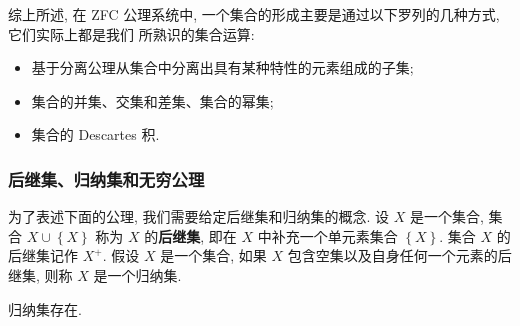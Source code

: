 \documentclass[10pt,UTF8]{book} %
\begin{document}
综上所述, 在 ZFC 公理系统中, 一个集合的形成主要是通过以下罗列的几种方式, 它们实际上都是我们
所熟识的集合运算:
\begin{itemize}[itemsep=0pt]
    \item 基于分离公理从集合中分离出具有某种特性的元素组成的子集;
    \item 集合的并集、交集和差集、集合的幂集;
    \item 集合的 Descartes 积.
\end{itemize}

\subsubsection{后继集、归纳集和无穷公理}

为了表述下面的公理, 我们需要给定后继集和归纳集的概念.
设 $X$ 是一个集合, 集合 $X \cup \left\{ X \right\}$ 称为 $X$ 的\textbf{后继集},
即在 $X$ 中补充一个单元素集合 $\left\{ X \right\}$. 集合 $X$ 的后继集记作
$X^+$.
假设 $X$ 是一个集合, 如果 $X$ 包含空集以及自身任何一个元素的后继集, 则称 $X$
是一个归纳集.


\begin{axiom}[无穷公理]
    归纳集存在.
\end{axiom}
\end{document}
